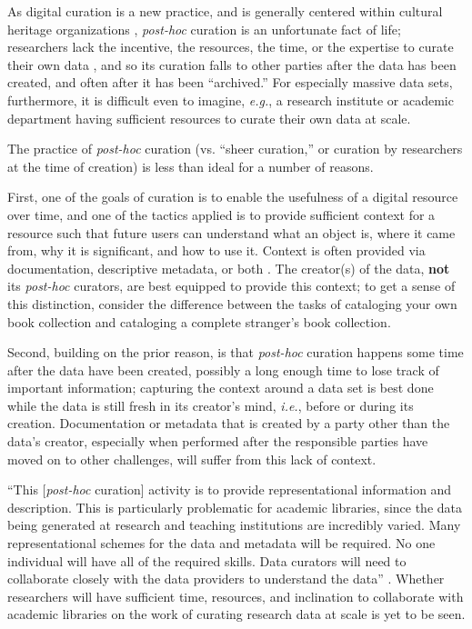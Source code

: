 \documentclass[man,12pt,biblatex]{apa6}
\begin{document}
As digital curation is a new practice, and is generally centered
within cultural heritage organizations , \textit{post-hoc} curation is an unfortunate
fact of life; researchers lack the incentive, the resources, the time,
or the expertise to curate their own data , and so its curation falls to other parties
after the data has been created, and often after it has been
``archived.'' For especially massive data sets, furthermore, it is difficult
even to imagine, \textit{e.g.}, a research institute or academic department
having sufficient resources to curate their own data at scale.

The practice of \textit{post-hoc} curation (vs. ``sheer curation,'' or
curation by researchers at the time of creation) is less than ideal
for a number of reasons.

First, one of the goals of curation is to enable the usefulness of a
digital resource over time, and one of the tactics applied is to
provide sufficient context for a resource such that future users can
understand what an object is, where it came from, why it is
significant, and how to use it. Context is often provided via
documentation, descriptive metadata, or both
\parencite{arl:stewardship,heidorn:libraries,curry:community,jisc:deluge}. The
creator(s) of the data, \textbf{not} its \textit{post-hoc} curators,
are best equipped to provide this context; to get a sense of this
distinction, consider the difference between the tasks of cataloging
your own book collection and cataloging a complete stranger's book
collection.

Second, building on the prior reason, is that \textit{post-hoc}
curation happens some time after the data have been created, possibly
a long enough time to lose track of important information; capturing
the context around a data set is best done while the data is still
fresh in its creator's mind, \textit{i.e.}, before or during its
creation. Documentation or metadata that is created by a party other
than the data's creator, especially when performed after the
responsible parties have moved on to other challenges, will suffer
from this lack of context.

``This [\textit{post-hoc} curation] activity is to provide
representational information and description. This is particularly
problematic for academic libraries, since the data being generated at
research and teaching institutions are incredibly varied. Many
representational schemes for the data and metadata will be
required. No one individual will have all of the required skills. Data
curators will need to collaborate closely with the data providers to
understand the data'' \parencite{heidorn:libraries}. Whether researchers
will have sufficient time, resources, and inclination to collaborate
with academic libraries on the work of curating research data at scale
is yet to be seen.
\end{document}
